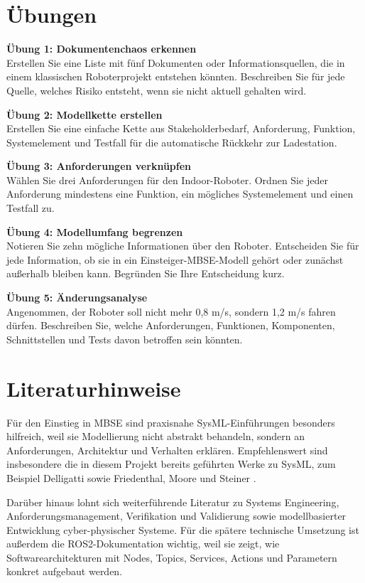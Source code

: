 \section{Übungen}
\begin{uebungbox}
\textbf{Übung 1: Dokumentenchaos erkennen}\\
Erstellen Sie eine Liste mit fünf Dokumenten oder Informationsquellen, die in einem klassischen Roboterprojekt entstehen könnten. Beschreiben Sie für jede Quelle, welches Risiko entsteht, wenn sie nicht aktuell gehalten wird.
\end{uebungbox}

\begin{uebungbox}
\textbf{Übung 2: Modellkette erstellen}\\
Erstellen Sie eine einfache Kette aus Stakeholderbedarf, Anforderung, Funktion, Systemelement und Testfall für die automatische Rückkehr zur Ladestation.
\end{uebungbox}

\begin{uebungbox}
\textbf{Übung 3: Anforderungen verknüpfen}\\
Wählen Sie drei Anforderungen für den Indoor-Roboter. Ordnen Sie jeder Anforderung mindestens eine Funktion, ein mögliches Systemelement und einen Testfall zu.
\end{uebungbox}

\begin{uebungbox}
\textbf{Übung 4: Modellumfang begrenzen}\\
Notieren Sie zehn mögliche Informationen über den Roboter. Entscheiden Sie für jede Information, ob sie in ein Einsteiger-MBSE-Modell gehört oder zunächst außerhalb bleiben kann. Begründen Sie Ihre Entscheidung kurz.
\end{uebungbox}

\begin{uebungbox}
\textbf{Übung 5: Änderungsanalyse}\\
Angenommen, der Roboter soll nicht mehr 0,8 m/s, sondern 1,2 m/s fahren dürfen. Beschreiben Sie, welche Anforderungen, Funktionen, Komponenten, Schnittstellen und Tests davon betroffen sein könnten.
\end{uebungbox}

\section{Literaturhinweise}
Für den Einstieg in MBSE sind praxisnahe SysML-Einführungen besonders hilfreich, weil sie Modellierung nicht abstrakt behandeln, sondern an Anforderungen, Architektur und Verhalten erklären. Empfehlenswert sind insbesondere die in diesem Projekt bereits geführten Werke zu SysML, zum Beispiel Delligatti \cite{delligatti2014} sowie Friedenthal, Moore und Steiner \cite{friedenthal2014}.

Darüber hinaus lohnt sich weiterführende Literatur zu Systems Engineering, Anforderungsmanagement, Verifikation und Validierung sowie modellbasierter Entwicklung cyber-physischer Systeme. Für die spätere technische Umsetzung ist außerdem die ROS2-Dokumentation \cite{ros2docs} wichtig, weil sie zeigt, wie Softwarearchitekturen mit Nodes, Topics, Services, Actions und Parametern konkret aufgebaut werden.
